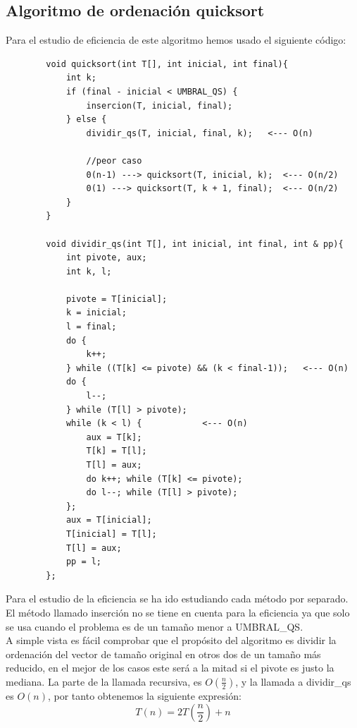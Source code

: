 \documentclass[11pt]{article}
\begin{document}
        \subsection*{Algoritmo de ordenación quicksort}
        Para el estudio de eficiencia de este algoritmo hemos usado el siguiente código:
        \begin{lstlisting}
        void quicksort(int T[], int inicial, int final){
            int k;
            if (final - inicial < UMBRAL_QS) {
                insercion(T, inicial, final);
            } else {
                dividir_qs(T, inicial, final, k);   <--- O(n)

                //peor caso    
                0(n-1) ---> quicksort(T, inicial, k);  <--- O(n/2)
                0(1) ---> quicksort(T, k + 1, final);  <--- O(n/2)
            }
        }

        void dividir_qs(int T[], int inicial, int final, int & pp){
            int pivote, aux;
            int k, l;

            pivote = T[inicial];
            k = inicial;
            l = final;
            do {
                k++;
            } while ((T[k] <= pivote) && (k < final-1));   <--- O(n)
            do {
                l--;
            } while (T[l] > pivote);
            while (k < l) {            <--- O(n)
                aux = T[k];
                T[k] = T[l];
                T[l] = aux;
                do k++; while (T[k] <= pivote);
                do l--; while (T[l] > pivote);
            };
            aux = T[inicial];
            T[inicial] = T[l];
            T[l] = aux;
            pp = l;
        };
        \end{lstlisting}
        Para el estudio de la eficiencia se ha ido estudiando cada método por separado. El método llamado inserción 
        no se tiene en cuenta para la eficiencia ya que solo se usa cuando el problema es de un tamaño menor a UMBRAL\_QS.\\
        A simple vista es fácil comprobar que el propósito del algoritmo es dividir la ordenación del vector de tamaño
        original en otros dos de un tamaño más reducido, en el mejor de los casos este será a la mitad si el pivote es 
        justo la mediana. La parte de la llamada recursiva, es $O(\frac{n}{2})$, y la llamada a dividir\_qs es $O(n)$, por tanto obtenemos
        la siguiente expresión:
        \begin{equation*}
            T(n) = 2 T(\frac{n}{2}) + n
        \end{equation*}
\end{document}
